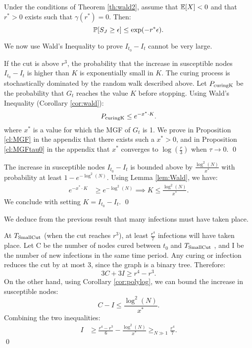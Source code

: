 \begin{corollary} \label{cor:wald} Under the conditions of Theorem \ref{th:wald2}, assume that $\mathbb{E}[X] < 0 $ and that $r^* > 0$ exists such that $\gamma(r^*) = 0$. Then:
 \[\mathbb{P}[S_J \geq \epsilon] \leq \exp(-r^*\epsilon). \]
\end{corollary}

We now use Wald's Inequality to prove $I_{t_0} - I_t$ cannot be very large.

\begin{lemma} \label{lem:Wald} 
If the cut is above $r^3$, the probability that the increase in susceptible nodes $I_{t_0} - I_t$ is higher than $K$ is exponentially small in $K$.
\proof
The curing process is stochastically dominated by the random walk described above.  Let $P_{\rm curingK}$ be the probability that $G_t$ reaches the value $K$ before stopping. 
Using Wald's Inequality (Corollary \ref{cor:wald}): 
$$ P_{\rm curingK} \leq e^{-x^*\cdot K}. $$
where $x^*$ is a value for which the MGF of $G_t$ is 1. We prove in Proposition \ref{cl:MGF} in the appendix that there exists such a $x^* > 0$, and in Proposition \ref{cl:MGFtau0}  in the appendix that $x^*$ converges to $\log(\frac{r}{3})$ when $\tau \to 0$.   \qed 
\end{lemma}

\begin{corollary} \label{cor:polylog}
The increase in susceptible nodes  $I_{t_0} - I_t$ is bounded above by $\frac{\log^2(N)}{x^*}$ with probability at least $1 - e^{-\log^2(N)}$.
\proof
Using Lemma \ref{lem:Wald}, we have:
\begin{align*}
e^{-x^*\cdot K} &\geq  e^{-\log^2(N)} \implies K \leq \frac{\log^2(N)}{x^*}.
\end{align*}
We conclude with setting $K = I_{t_0} - I_t$.
\qed 
\end{corollary}

We deduce from the previous result that many infections must have taken place.

\begin{proposition} \label{cl:GmanyInfection} 
At $T_{\rm SmallCut}$ (when the cut reaches $r^3$), at least $\frac{ r^4 }{7}$ infections will have taken place.
\proof Let C be the number of nodes cured between $t_0$ and $T_{\rm Small Cut}$ , and I be the number of new infections in the same time period. Any curing or infection reduces the cut by at most 3, since the graph is a binary tree. Therefore:
$$ 3C + 3I \geq r^4 - r^3.$$
On the other hand, using Corollary \ref{cor:polylog}, we can bound the increase in susceptible nodes:
$$ C - I \leq \frac{\log^2(N)}{x^*} .$$
Combining the two inequalities:
\begin{align*}
 I &\geq \frac{ r^4 - r^3}{6} - \frac{\log^2(N)}{x^*} \geq_{N \gg 1} \frac{ r^4}{7}.
\end{align*} 
\qed 
\end{proposition}

